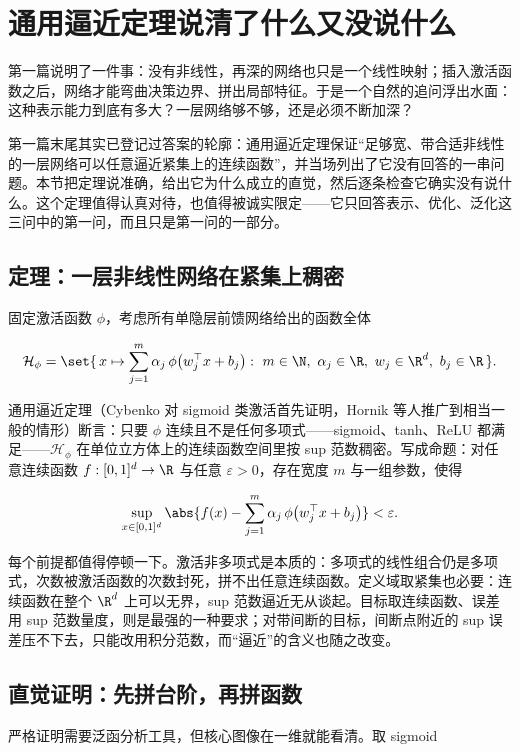 \section{通用逼近定理说清了什么又没说什么}

第一篇说明了一件事：没有非线性，再深的网络也只是一个线性映射；插入激活函数之后，网络才能弯曲决策边界、拼出局部特征。于是一个自然的追问浮出水面：这种表示能力到底有多大？一层网络够不够，还是必须不断加深？

第一篇末尾其实已登记过答案的轮廓：通用逼近定理保证``足够宽、带合适非线性的一层网络可以任意逼近紧集上的连续函数''，并当场列出了它没有回答的一串问题。本节把定理说准确，给出它为什么成立的直觉，然后逐条检查它确实没有说什么。这个定理值得认真对待，也值得被诚实限定——它只回答表示、优化、泛化这三问中的第一问，而且只是第一问的一部分。

\subsection{定理：一层非线性网络在紧集上稠密}

固定激活函数 \(\phi\)，考虑所有单隐层前馈网络给出的函数全体

\[
\mathcal H_\phi
=\set{\,x\mapsto\sum_{j=1}^{m}\alpha_j\,
\phi\bigl(w_j^\top x+b_j\bigr)
:\ m\in\N,\ \alpha_j\in\R,\ w_j\in\R^d,\ b_j\in\R\,}.
\]

通用逼近定理（Cybenko 对 sigmoid 类激活首先证明，Hornik 等人推广到相当一般的情形）断言：只要 \(\phi\) 连续且不是任何多项式——sigmoid、tanh、ReLU 都满足——\(\mathcal H_\phi\) 在单位立方体上的连续函数空间里按 sup 范数稠密。写成命题：对任意连续函数 \(f:[0,1]^d\to\R\) 与任意 \(\varepsilon>0\)，存在宽度 \(m\) 与一组参数，使得

\[
\sup_{x\in[0,1]^d}
\abs{f(x)-\sum_{j=1}^{m}\alpha_j\,
\phi\bigl(w_j^\top x+b_j\bigr)}
<\varepsilon.
\]

每个前提都值得停顿一下。激活非多项式是本质的：多项式的线性组合仍是多项式，次数被激活函数的次数封死，拼不出任意连续函数。定义域取紧集也必要：连续函数在整个 \(\R^d\) 上可以无界，sup 范数逼近无从谈起。目标取连续函数、误差用 sup 范数量度，则是最强的一种要求；对带间断的目标，间断点附近的 sup 误差压不下去，只能改用积分范数，而``逼近''的含义也随之改变。

\subsection{直觉证明：先拼台阶，再拼函数}

严格证明需要泛函分析工具，但核心图像在一维就能看清。取 sigmoid

